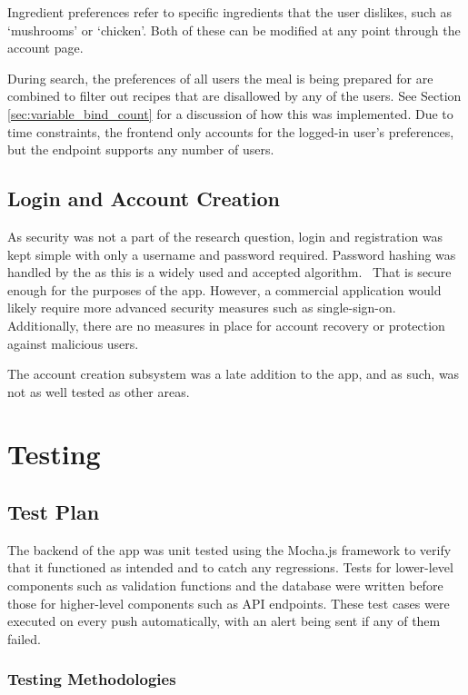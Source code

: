 Ingredient preferences refer to specific ingredients that the user dislikes, such as \enquote*{mushrooms} or
\enquote*{chicken}. Both of these can be modified at any point through the account page.

During search, the preferences of all users the meal is being prepared for are combined to filter out recipes
that are disallowed by any of the users. See Section \ref{sec:variable_bind_count} for a discussion of how this was implemented.
Due to time constraints, the frontend only accounts for the logged-in user's preferences, but the endpoint
supports any number of users.

\subsection{Login and Account Creation}
As security was not a part of the research question, login and registration was kept simple with only a username
and password required. Password hashing was handled by the  as this is a widely used and
accepted algorithm.~\cite{ntantogian_evaluation_2019} That is secure enough for the purposes of the app. However,
a commercial application would likely require more advanced security measures such as single-sign-on. Additionally,
there are no measures in place for account recovery or protection against malicious users.

The account creation subsystem was a late addition to the app, and as such, was not as well tested as other areas.

\section{Testing}

\subsection{Test Plan}
The backend of the app was unit tested using the Mocha.js framework
to verify that it functioned as intended and to catch any regressions. Tests for lower-level components
such as validation functions and the database were written before those for higher-level
components such as API endpoints. These test cases were executed on every push automatically,
with an alert being sent if any of them failed.

\subsubsection{Testing Methodologies}

